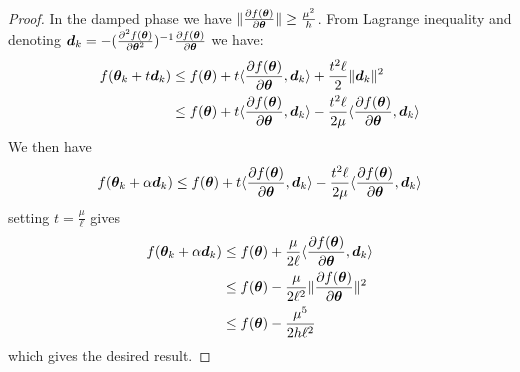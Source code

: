  \begin{proof}
   In the damped phase we have  $\| \partialfrac{\thetab}{f(\thetab)} \| \geq
   \frac{\mu^2}{h}$.
   From Lagrange inequality and denoting $\db_k = -(\partialfrac{\thetab^2}{^2 f(\thetab)})^{-1} \partialfrac{\thetab}{f(\thetab)}$ we have:
   \begin{align}
     f(\thetab_k + t \db_k) & \leq f(\thetab) + t \dotp{ \partialfrac{\thetab}{f(\thetab)} }{ \db_k }  +  \frac{t^2 \ell}{2} \|\db_k\|^2 \\
                        & \leq f(\thetab) + t \dotp{ \partialfrac{\thetab}{f(\thetab)} }{ \db_k }  -  \frac{t^2 \ell}{2 \mu} \dotp{ \partialfrac{\thetab}{f(\thetab)} }{ \db_k } \\
   \end{align}
   We then have 
   \begin{align}
     &  f(\thetab_k + \alpha \db_k)  \leq f(\thetab) + t \dotp{ \partialfrac{\thetab}{f(\thetab)} }{ \db_k }  -  \frac{t^2 \ell}{2 \mu} \dotp{ \partialfrac{\thetab}{f(\thetab)} }{ \db_k } \\
   \end{align}
   setting $t = \frac{\mu}{\ell}$ gives
   \begin{align}
       f(\thetab_k +\alpha \db_k)  &\leq f(\thetab) + \frac{\mu}{2\ell} \dotp{ \partialfrac{\thetab}{f(\thetab)} }{ \db_k }  \\
     &\leq f(\thetab) - \frac{\mu}{2\ell^2} \|\partialfrac{\thetab}{f(\thetab)}\|^2  \\
     &\leq f(\thetab) - \frac{\mu^5}{2h \ell^2} \\
   \end{align}
   which gives the desired result.


\end{proof}
